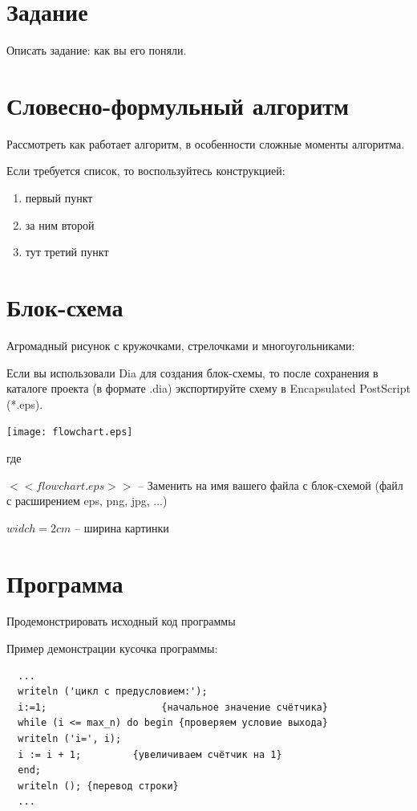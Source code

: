 \section{Задание}
Описать задание: как вы его поняли.







\section{Словесно-формульный алгоритм}
Рассмотреть как работает алгоритм, в особенности сложные моменты
алгоритма.

Если требуется список, то воспользуйтесь конструкцией:
\begin{enumerate} %
\item первый пункт
\item за ним второй
\item тут третий пункт
\end{enumerate} %







\section{Блок-схема}
Агромадный рисунок с кружочками, стрелочками и многоугольниками:

Если вы использовали Dia для создания блок-схемы, то после сохранения
в каталоге проекта (в формате .dia) экспортируйте схему в Encapsulated
PostScript (*.eps).


\texttt{[image: flowchart.eps]}

где \begin{description}
\item $ <<flowchart.eps>> $ -- Заменить на имя вашего файла с
  блок-схемой (файл с расширением eps, png, jpg, ...)
\item $ widch=2cm $ -- ширина картинки
\end{description}







\section{Программа}
Продемонстрировать исходный код программы

Пример демонстрации кусочка программы:
\begin{lstlisting}
  ...
  writeln ('цикл с предусловием:');
  i:=1;                    {начальное значение счётчика}
  while (i <= max_n) do begin {проверяем условие выхода}
  writeln ('i=', i);
  i := i + 1;         {увеличиваем счётчик на 1}
  end;
  writeln (); {перевод строки}
  ...
\end{lstlisting}


